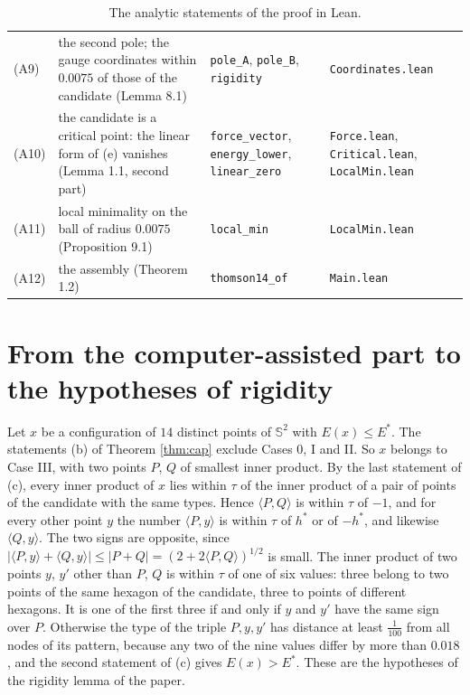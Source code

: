 \documentclass[reqno,a4paper,11pt]{amsart}
\newcommand{\Sph}{\mathbb{S}}
\newcommand{\lean}[1]{\texttt{#1}}
\newcommand{\file}[1]{\nolinkurl{#1}}
\begin{document}
\begin{table}[ht]
\begin{tabular}{@{}lp{}p{}p{}@{}}
(A9) & the second pole; the gauge coordinates within $0.0075$ of those of the candidate (Lemma 8.1) & \lean{pole\_A}, \lean{pole\_B}, \newline \lean{rigidity} & \file{Coordinates.lean} \\
(A10) & the candidate is a critical point: the linear form of (e) vanishes (Lemma 1.1, second part) & \lean{force\_vector}, \newline \lean{energy\_lower}, \newline \lean{linear\_zero} & \file{Force.lean}, \newline \file{Critical.lean}, \newline \file{LocalMin.lean} \\
(A11) & local minimality on the ball of radius $0.0075$ (Proposition 9.1) & \lean{local\_min} & \file{LocalMin.lean} \\
(A12) & the assembly (Theorem 1.2) & \lean{thomson14\_of} & \file{Main.lean} \\
\bottomrule
\end{tabular}
\medskip
\caption{The analytic statements of the proof in Lean.}\label{tab:analytic}
\end{table}

\section{From the computer-assisted part to the hypotheses of rigidity}

Let $x$ be a configuration of $14$ distinct points of $\Sph^2$ with $E(x) \leq E^*$. The statements (b) of Theorem \ref{thm:cap} exclude Cases 0, I and II. So $x$ belongs to Case III, with two points $P$, $Q$ of smallest inner product. By the last statement of (c), every inner product of $x$ lies within $\tau$ of the inner product of a pair of points of the candidate with the same types. Hence $\langle P, Q \rangle$ is within $\tau$ of $-1$, and for every other point $y$ the number $\langle P, y \rangle$ is within $\tau$ of $h^*$ or of $-h^*$, and likewise $\langle Q, y \rangle$. The two signs are opposite, since $|\langle P, y \rangle + \langle Q, y \rangle| \leq |P + Q| = (2 + 2 \langle P, Q \rangle)^{1/2}$ is small. The inner product of two points $y$, $y'$ other than $P$, $Q$ is within $\tau$ of one of six values: three belong to two points of the same hexagon of the candidate, three to points of different hexagons. It is one of the first three if and only if $y$ and $y'$ have the same sign over $P$. Otherwise the type of the triple $P, y, y'$ has distance at least $\frac{1}{100}$ from all nodes of its pattern, because any two of the nine values differ by more than $0.018$, and the second statement of (c) gives $E(x) > E^*$. These are the hypotheses of the rigidity lemma of the paper.
\end{document}
